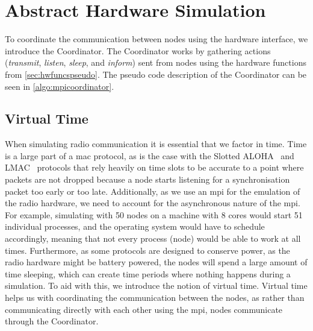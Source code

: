 \section{Abstract Hardware Simulation}\label{sec:coordinator}
To coordinate the communication between nodes using the hardware interface, we introduce the Coordinator. The
Coordinator works by gathering actions (\textit{transmit}, \textit{listen}, \textit{sleep}, and
\textit{inform}) sent from nodes using the hardware functions from \autoref{sec:hwfuncspseudo}. The pseudo
code description of the Coordinator can be seen in \autoref{algo:mpicoordinator}. 

\subsection{Virtual Time}\label{sec:virtual-time}
When simulating radio communication it is essential that we factor in time. Time is a large part of a
\gls{mac} protocol, as is the case with the Slotted ALOHA~\cite{Roberts:1975:APS:1024916.1024920} and
LMAC~\cite{paper:lmac_protocol} protocols that rely heavily on time slots to be accurate to a point where
packets are not dropped because a node starts listening for a synchronisation packet too early or too late.
Additionally, as we use an \acrshort{mpi} for the emulation of the radio hardware, we need to account for the
asynchronous nature of the \acrshort{mpi}. For example, simulating with 50 nodes on a machine with 8
cores would start 51 individual processes, and the operating system would have to schedule accordingly,
meaning that not every process (node) would be able to work at all times. Furthermore, as some protocols are
designed to conserve power, as the radio hardware might be battery powered, the nodes will spend a large
amount of time sleeping, which can create time periods where nothing happens during a simulation. To aid with
this, we introduce the notion of virtual time. Virtual time helps us with coordinating the communication
between the nodes, as rather than communicating directly with each other using the \gls{mpi}, nodes
communicate through the Coordinator. \smallbreak

